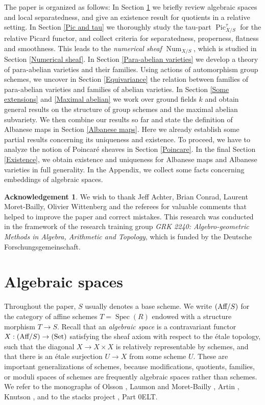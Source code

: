 \documentclass[oneside, 12pt]{amsart}
\newcommand\mylabel[1]{\label{#1}\marginpar{\raggedright\vspace{-1ex}\medskip\medskip\footnotesize \tt #1}}
\renewcommand\mylabel[1]{\label{#1}}
\theoremstyle{definition}
\newtheorem*{acknowledgement}{Acknowledgement}
\theoremstyle{remark}
\newcommand{\Aff}{\text{\rm Aff}}
\newcommand{\Num}{\operatorname{Num}}
\newcommand{\Pic}{\operatorname{Pic}}
\newcommand{\ra}{\rightarrow}
\newcommand{\Set}{{\text{\rm Set}}}
\newcommand{\Spec}{\operatorname{Spec}}
\begin{document}
\medskip
The paper is organized as follows:
In Section \ref{Algebraic spaces} we briefly review algebraic spaces and local separatedness,
and give an existence result for quotients in a relative setting.
In Section \ref{Pic and tau} we thoroughly study  the tau-part $\Pic_{X/S}^\tau$ for the relative Picard functor, and
collect criteria for separatedness, properness,  flatness and smoothness.
This leads to the \emph{numerical sheaf} $\Num_{X/S}$, which is studied in Section \ref{Numerical sheaf}.
In Section  \ref{Para-abelian varieties} we develop a theory of para-abelian varieties and their families. 
Using actions of automorphism group schemes, we uncover in Section \ref{Equivariance} the relation between families of para-abelian varieties
and families of abelian varieties.
In Section \ref{Some extensions} and \ref{Maximal abelian} we work over ground fields $k$ and obtain   general results on the structure of group schemes
and the maximal abelian subvariety.
We then combine our results so far and state the definition of Albanese maps in Section \ref{Albanese maps}. Here we already 
establish some partial results concerning its uniqueness and existence. To proceed, we have to analyze the notion
of Poincar\'e sheaves in Section \ref{Poincare}.
In the final Section \ref{Existence}, we obtain existence and uniqueness for  Albanese maps and Albanese varieties
in full generality. In the Appendix, we collect some facts concerning embeddings of algebraic spaces.

\begin{acknowledgement}
We wish to thank Jeff Achter, Brian Conrad,  Laurent Moret-Bailly, Olivier Wittenberg and the referees for valuable comments
that helped to improve the paper and correct mistakes.
This research was conducted in the framework of the   research training group
\emph{GRK 2240: Algebro-geometric Methods in Algebra, Arithmetic and Topology}, which is funded
by the Deutsche Forschungsgemeinschaft. 
\end{acknowledgement}


\section{Algebraic spaces}
\mylabel{Algebraic spaces}
 
Throughout the   paper, $S$ usually denotes a base scheme. We write $(\Aff/S)$ for the category of affine  schemes $T=\Spec(R)$
endowed with  a structure morphism $T\ra S$.
Recall that an \emph{algebraic space} is a contravariant functor $X:(\Aff/S)\ra(\Set)$
satisfying the sheaf axiom with respect to the \'etale topology, such that   
the diagonal $X\ra X\times X$ is relatively representable by schemes,
and that there is an \'etale surjection $U\ra X$ from some scheme $U$. These are important
generalizations of schemes, because modifications, quotients, families, or moduli spaces  of schemes  
are frequently algebraic spaces rather than schemes.
We refer to the monographs of 
Olsson \cite{Olsson 2016}, Laumon and Moret-Bailly \cite{Laumon; Moret-Bailly 2000}, 
Artin \cite{Artin 1971}, Knutson \cite{Knutson 1971}, and to the stacks project
\cite{SP}, Part 0ELT. 
\end{document}
